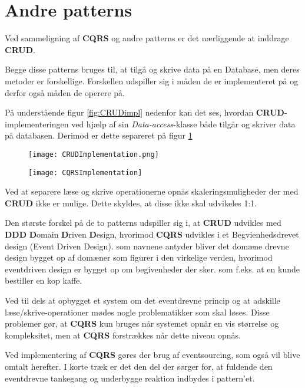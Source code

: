 \section{Andre patterns}
Ved sammeligning af \textbf{CQRS} og andre patterns er det nærliggende at inddrage \textbf{CRUD}.

Begge disse patterns bruges til, at tilgå og skrive data på en Database, men deres metoder er forskellige. Forskellen udspiller sig i måden de er implementeret på og derfor også måden de operere på.\newline

På understående figur \ref{fig:CRUDimpl} nedenfor kan det ses, hvordan \textbf{CRUD}-implementeringen ved hjælp af sin \textit{Data-access}-klasse både tilgår og skriver data på databasen. Derimod er dette separeret på figur \ref{fig:CQRSimpl}

\begin{figure}[H]
	\centering
	\begin{minipage}{.5\textwidth}
		\centering
		\texttt{[image: CRUDImplementation.png]}
		\label{fig:CRUDimpl}
	\end{minipage}%
	\begin{minipage}{.5\textwidth}
		\centering
		\texttt{[image: CQRSImplementation]}
		\label{fig:CQRSimpl}
	\end{minipage}
\end{figure}

Ved at separere læse og skrive operationerne opnås skaleringsmuligheder der med \textbf{CRUD} ikke er mulige. Dette skyldes, at disse ikke skal udvikeles 1:1.\newline

Den største forskel på de to patterns udspiller sig i, at \textbf{CRUD} udvikles med \textbf{DDD} \textbf{D}omain \textbf{D}riven \textbf{D}esign, hvorimod \textbf{CQRS} udvikles i et Begvienhedsdrevet design (Event Driven Design). som navnene antyder bliver det domæne drevne design bygget op af domæner som figurer i den virkelige verden, hvorimod eventdriven design er bygget op om begivenheder der sker. som f.eks. at en kunde bestiller en kop kaffe.

Ved til dels at opbygget et system om det eventdrevne princip og at adskille læse/skrive-operationer mødes nogle problematikker som skal løses. Disse problemer gør, at \textbf{CQRS} kun bruges når systemet opnår en vis størrelse og kompleksitet, men at \textbf{CQRS} forstrækkes når dette niveau opnås.\newline

Ved implementering af \textbf{CQRS} gøres der brug af eventsourcing, som også vil blive omtalt herefter. I korte træk er det den del der sørger for, at fuldende den eventdrevne tankegang og underbygge reaktion indbydes i pattern'et.
